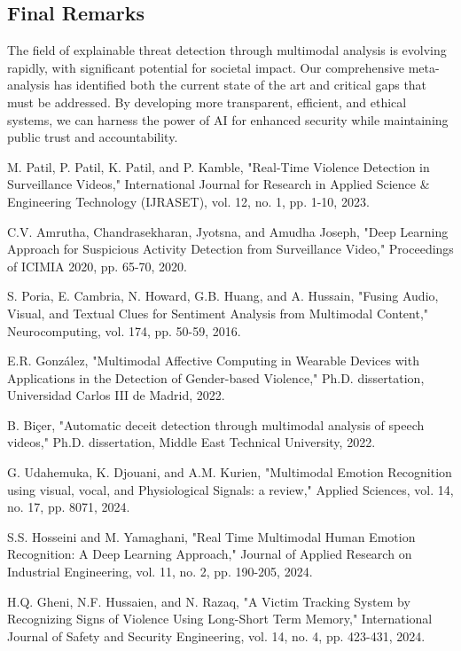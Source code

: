 \documentclass[conference,compsoc]{IEEEtran}
\begin{document}
\subsection{Final Remarks}
The field of explainable threat detection through multimodal analysis is evolving rapidly, with significant potential for societal impact. Our comprehensive meta-analysis has identified both the current state of the art and critical gaps that must be addressed. By developing more transparent, efficient, and ethical systems, we can harness the power of AI for enhanced security while maintaining public trust and accountability.


\begin{thebibliography}{00}
 M. Patil, P. Patil, K. Patil, and P. Kamble, "Real-Time Violence Detection in Surveillance Videos," International Journal for Research in Applied Science \& Engineering Technology (IJRASET), vol. 12, no. 1, pp. 1-10, 2023.

 C.V. Amrutha, Chandrasekharan, Jyotsna, and Amudha Joseph, "Deep Learning Approach for Suspicious Activity Detection from Surveillance Video," Proceedings of ICIMIA 2020, pp. 65-70, 2020.

 S. Poria, E. Cambria, N. Howard, G.B. Huang, and A. Hussain, "Fusing Audio, Visual, and Textual Clues for Sentiment Analysis from Multimodal Content," Neurocomputing, vol. 174, pp. 50-59, 2016.

 E.R. González, "Multimodal Affective Computing in Wearable Devices with Applications in the Detection of Gender-based Violence," Ph.D. dissertation, Universidad Carlos III de Madrid, 2022.

 B. Biçer, "Automatic deceit detection through multimodal analysis of speech videos," Ph.D. dissertation, Middle East Technical University, 2022.

 G. Udahemuka, K. Djouani, and A.M. Kurien, "Multimodal Emotion Recognition using visual, vocal, and Physiological Signals: a review," Applied Sciences, vol. 14, no. 17, pp. 8071, 2024.

 S.S. Hosseini and M. Yamaghani, "Real Time Multimodal Human Emotion Recognition: A Deep Learning Approach," Journal of Applied Research on Industrial Engineering, vol. 11, no. 2, pp. 190-205, 2024.

 H.Q. Gheni, N.F. Hussaien, and N. Razaq, "A Victim Tracking System by Recognizing Signs of Violence Using Long-Short Term Memory," International Journal of Safety and Security Engineering, vol. 14, no. 4, pp. 423-431, 2024.


\end{thebibliography}
\end{document}
